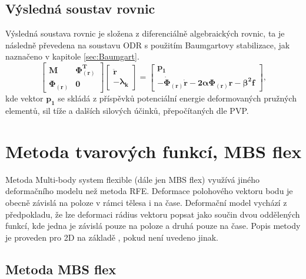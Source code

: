 \subsection{Výsledná soustav rovnic}
Výsledná soustava rovnic je složena z diferenciálně algebraických rovnic, ta je následně převedena na soustavu ODR s použitím Baumgartovy stabilizace, jak naznačeno v kapitole \ref{sec:Baumgart}.
\begin{equation*}
	\begin{bmatrix}
		\mathbf{M} & \mathbf{\Phi_{(r)}^T} \\
		\mathbf{\Phi_{(r)}} & \mathbf{0}
	\end{bmatrix}
	\begin{bmatrix}
		\mathbf{\ddot{r}}\\
		\mathbf{-\lambda_k}
	\end{bmatrix}
	=
	\begin{bmatrix}
		\mathbf{p_1}\\
		\mathbf{- \mathbf{\dot{\Phi}_{(r)}}\mathbf{\dot{r}} - 2\alpha \mathbf{\Phi_{(r)}} \mathbf{r} - \beta^2\mathbf{f}}
	\end{bmatrix},
\end{equation*}
kde vektor $ \mathbf{p_1}$ se skládá z příspěvků potenciální energie deformovaných pružných elementů, sil tíže a dalších silových účinků, přepočítaných dle PVP.

\section{Metoda tvarových funkcí, MBS flex} \label{sec:MBS}

Metoda Multi-body system flexible (dále jen MBS flex) využívá jiného deformačního modelu než metoda RFE. Deformace polohového vektoru bodu je obecně závislá na poloze v rámci tělesa i na čase. Deformační model vychází z předpokladu, že lze deformaci rádius vektoru popsat jako součin dvou oddělených funkcí, kde jedna je závislá pouze na poloze a druhá pouze na čase. Popis metody je proveden pro 2D na základě \cite{cite:bible,cite:MBS_Vamp,cite:MBS}, pokud není uvedeno jinak.
\subsection{Metoda MBS flex}

